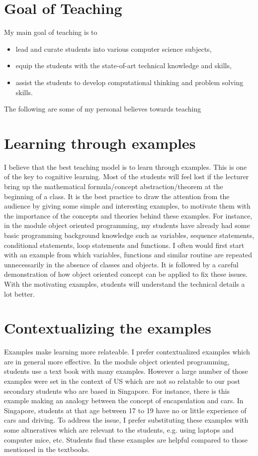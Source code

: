 \documentclass[12pt]{article}
\theoremstyle{plain} \numberwithin{equation}{section}
\theoremstyle{definition}
\begin{document}
\raisebox{1cm}

\section{Goal of Teaching}
My main goal of teaching is to
\begin{itemize}
   \item lead and curate students into various computer science subjects,
   \item equip the students with the state-of-art technical knowledge
     and skills,
   \item assist the students to develop computational thinking and problem solving skills. 
\end{itemize}
%
The following are some of my personal believes towards teaching

\section{Learning through examples}
I believe that the best teaching model is to learn through examples.
This is one of the key to cognitive learning. Most of the students will
feel lost if the lecturer bring up the mathematical formula/concept abstraction/theorem
at the beginning of a class. It is the best practice to draw the attention
from the audience by giving some simple and interesting examples, to motivate them with 
the importance of the concepts and theories behind these examples. For instance, in
the module object oriented programming, my students have already had
some basic programming background knowledge such as variables,
sequence statements, conditional statements, loop statements and
functions. I often would first start with an example from which variables, functions and similar routine are
repeated unnecessarily in the absence of classes and objects. It is
followed by a careful demonstration of how object oriented concept can be applied
to fix these issues. With the motivating examples, students will
understand the technical details a lot better.

\section{Contextualizing the examples}
Examples make learning more relateable. 
I prefer contextualized examples which are in general
more effective. In the module object oriented programming, students
use a text book with many examples. However a large number of
those examples were set in the context of US which are not so
relatable to our post secondary students who are based
in Singapore. For instance, there is this example making an analogy
between the concept of encapsulation and cars. In Singapore, students
at that age between 17 to 19 have no or little
experience of cars and driving. To address the issue, I prefer substituting these
examples with some altneratives which are relevant to the students,
e.g. using laptops and computer mice, etc. Students find these examples are
helpful compared to those mentioned in the textbooks.
\end{document}
